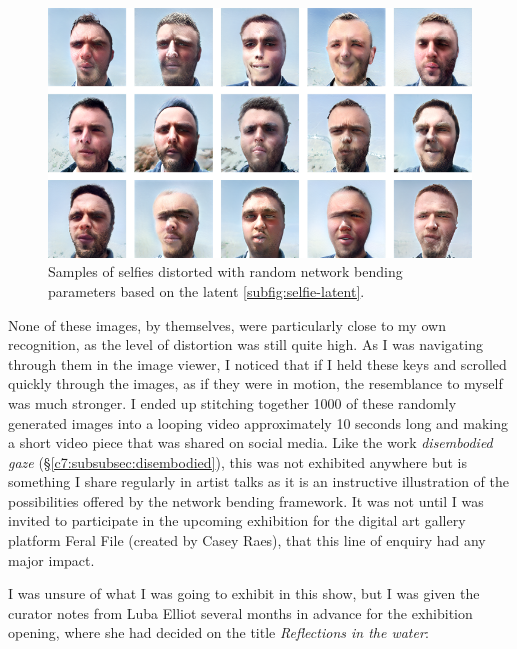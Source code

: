 \begin{figure}[!htb]
    \centering
    \captionsetup{justification=centering}
    \includegraphics[width=1\textwidth]{figures/c7_impact/selfie/selfie-series.png}
    \caption[Samples of selfies distorted with random network bending parameters]{ Samples of selfies distorted with random network bending parameters based on the latent \ref{subfig:selfie-latent}.}
    \label{fig:c7:selfie-series}
\end{figure}


None of these images, by themselves, were particularly close to my own recognition, as the level of distortion was still quite high.
As I was navigating through them in the image viewer, I noticed that if I held these keys and scrolled quickly through the images, as if they were in motion, the resemblance to myself was much stronger. 
I ended up stitching together 1000 of these randomly generated images into a looping video approximately 10 seconds long and making a short video piece that was shared on social media. 
Like the work \textit{disembodied gaze} (\S \ref{c7:subsubsec:disembodied}), this was not exhibited anywhere but is something I share regularly in artist talks as it is an instructive illustration of the possibilities offered by the network bending framework.
It was not until I was invited to participate in the upcoming exhibition for the digital art gallery platform Feral File (created by Casey Raes), that this line of enquiry had any major impact. 

I was unsure of what I was going to exhibit in this show, but I was given the curator notes from Luba Elliot several months in advance for the exhibition opening, where she had decided on the title \textit{Reflections in the water}:

